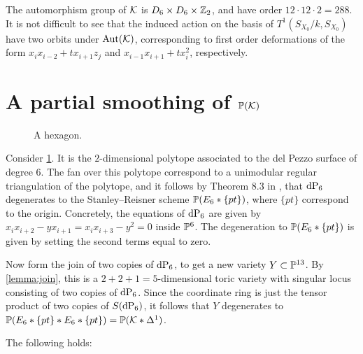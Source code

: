 The automorphism group of $\K$ is $D_6 \times D_6 \times \Z_2$, and have order $12 \cdot 12 \cdot 2=288$. It is not difficult to see that the induced action on the basis of $T^1(S_{X_0}/k,S_{X_0})$ have two orbits under $\Aut(\K)$, corresponding to first order deformations of the form $x_ix_{i-2}+t x_{i+1}z_j$ and $x_{i-1}x_{i+1}+tx_i^2$, respectively. 

\section{A partial smoothing of $\P(\mathcal K)$}

\begin{figure}[b]
\centering

\caption{A hexagon.}
\label{fig:hexagon}
\end{figure}

Consider \cref{fig:hexagon}. It is the $2$-dimensional polytope associated to the del Pezzo surface of degree $6$. The fan over this polytope correspond to a unimodular regular triangulation of the polytope, and it follows by Theorem 8.3 in \cite{sturmfels}, that $\dP6$ degenerates to the Stanley--Reisner scheme $\P(E_6 \ast \{pt\})$, where $\{ pt \}$ correspond to the origin. Concretely, the equations of $\dP6$ are given by $x_ix_{i+2}-yx_{i+1}=x_ix_{i+3}-y^2=0$ inside $\P^6$. The degeneration to $\P(E_6 \ast \{ pt \})$ is given by setting the second terms equal to zero.

Now form the join of two copies of $\dP6$, to get a new variety $Y \subset \P^{13}$. By \cref{lemma:join}, this is a $2+2+1=5$-dimensional toric variety with singular locus consisting of two copies of $\dP6$. Since the coordinate ring is just the tensor product of two copies of $S(\dP6)$, it follows that $Y$ degenerates to $\P(E_6 \ast \{pt\} \ast E_6 \ast \{ pt \})=\P(\K \ast \Delta^1)$.

The following holds:

